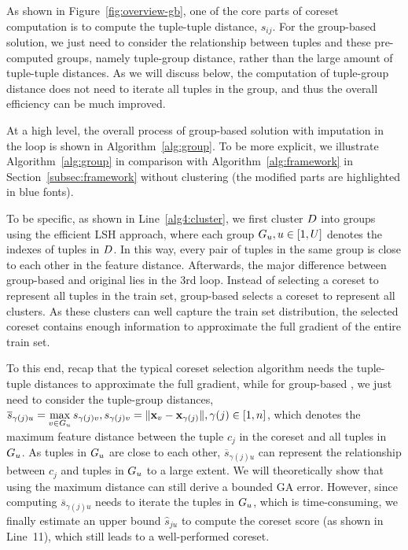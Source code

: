 As shown in Figure~\ref{fig:overview-gb}, one of the core parts of coreset computation is to compute the tuple-tuple distance, \ie $s_{ij}$. For the group-based solution, we just need to consider the relationship between tuples and these pre-computed groups, namely tuple-group distance, rather than the large amount of tuple-tuple distances. As we will discuss below, the computation of tuple-group distance does not need to iterate all tuples in the group, and thus  the overall efficiency can be much improved. 

At a high level, the overall process of group-based \ours solution with imputation in the loop is shown in Algorithm~\ref{alg:group}. To be more explicit, we illustrate Algorithm~\ref{alg:group} in comparison with Algorithm~\ref{alg:framework} in Section~\ref{subsec:framework} without clustering (the modified parts are highlighted in blue fonts).

To be specific, as shown in Line~\ref{alg4:cluster}, we first cluster $D$ into groups using the efficient LSH approach, where each group $G_u, u\in[1, U]$ denotes the indexes of tuples in $D$. In this way, every pair of tuples in the same group is close to each other in the feature distance.
%
 Afterwards, the major difference between group-based \ours and original \ours lies in the 3rd loop. Instead of  selecting a coreset to represent all tuples in the train set, group-based \ours selects a coreset to represent all clusters. As these clusters can well capture the train set distribution, the selected coreset contains enough information to approximate the full gradient of the entire train set. 
 
 To this end, recap that the typical coreset selection algorithm needs the tuple-tuple distances to approximate the full gradient, while for group-based \ours, we just need to consider the tuple-group distances, \ie  
$\overline{s}_{\gamma(j)u} = \max\limits_{v \in G_u} s_{\gamma(j)v}, s_{\gamma(j)v} = \lVert\mathbf{x}_v - \mathbf{x}_{\gamma(j)}\rVert, \gamma(j)\in[1, n]$, which denotes the maximum feature distance between the tuple $c_j$ in the coreset and all tuples in $G_u$. As tuples in $G_u$ are close to each other, $\overline{s}_{\gamma(j)u}$ can represent the relationship between $c_j$ and tuples in $G_u$ to a large extent.
%
We will theoretically show that using the maximum distance can still derive a bounded GA error. 
However, since computing $\overline{s}_{\gamma(j)u}$ needs to iterate the tuples in $G_u$, which is time-consuming, we finally estimate an upper bound $\hat{s}_{ju}$ to compute the coreset score (as shown in Line~11), which still leads to a well-performed coreset. 
%


